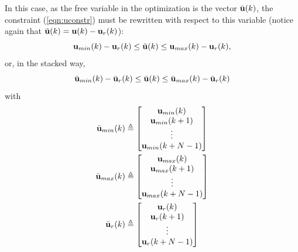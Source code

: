 \documentclass[conference]{IEEEtran} %
\begin{document}
In this case, as the free variable in the optimization is the vector $\bar{\bf u}(k)$, the constraint (\ref{eqn:uconstr}) must be rewritten with respect to this variable (notice again that $\tilde{\bf u}(k)={\bf u}(k)-{\bf u}_r(k)$):
\begin{equation*}
	{\bf u}_{min}(k) - {\bf u}_r(k) \leq \tilde{\bf u}(k) \leq {\bf u}_{max}(k) - {\bf u}_r(k),
\end{equation*}
or, in the stacked way,
\begin{equation*}
	\bar{\bf u}_{min}(k) - \bar{\bf u}_r(k) \leq \bar{\bf u}(k) \leq \bar{\bf u}_{max}(k) - \bar{\bf u}_r(k)
\end{equation*}
\noindent with
\begin{align*}
	\bar{\bf u}_{min}(k) &\triangleq \begin{bmatrix}
		{\bf u}_{min}(k) \\ {\bf u}_{min}(k+1) \\ \vdots \\ {\bf u}_{min}(k+N-1)
	\end{bmatrix} \\
	\bar{\bf u}_{max}(k) &\triangleq \begin{bmatrix}
		{\bf u}_{max}(k) \\ {\bf u}_{max}(k+1) \\ \vdots \\ {\bf u}_{max}(k+N-1)
	\end{bmatrix} \\
	\bar{\bf u}_r(k) &\triangleq \begin{bmatrix}
		{\bf u}_r(k) \\ {\bf u}_r(k+1) \\ \vdots \\ {\bf u}_r(k+N-1)
	\end{bmatrix}
\end{align*}
\end{document}
